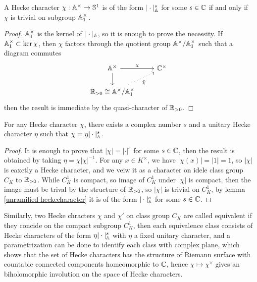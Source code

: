 \begin{lemma} \label{unramified-heckecharacter}
    A Hecke character \(\chi:\mathbb{A}^\times \to \mathbb{S}^1\) is of the form \(|\cdot|^s_{\mathbb{A}}\) for some \(s \in \mathbb{C}\) if and only if \(\chi\) is trivial on subgroup \(\mathbb{A}_1^\times\).
\end{lemma}

\begin{proof}
    \(\mathbb{A}_1^\times\) is the kernel of \(|\cdot|_{\mathbb{A}}\), so it is enough to prove the necessity. If \(\mathbb{A}_1^\times \subset \ker \chi\), then \(\chi\) factors through the quotient group \(\mathbb{A}^\times/\mathbb{A}_1^\times\) such that a diagram commutes
\[\begin{tikzcd}
	{\mathbb{A}^\times} & {\mathbb{C}}^\times \\
	{\rr_{>0} \cong \mathbb{A}^\times/\mathbb{A}_1^\times}
	\arrow["\chi", from=1-1, to=1-2]
	\arrow[from=1-1, to=2-1]
	\arrow["{\bar{\chi}}"', dotted, from=2-1, to=1-2]
\end{tikzcd}\]
     then the result is immediate by the quasi-character of \(\mathbb{R}_{>0}\).
\end{proof}

\begin{lemma}
    For any Hecke character \(\chi\), there exists a complex number \(s\) and a unitary Hecke character \(\eta\) such that \(\chi = \eta |\cdot|^s_{\mathbb{A}}\).
\end{lemma}

\begin{proof}
It is enough to prove that \(|\chi| = |\cdot|^s\) for some \(s \in \mathbb{C}\), then the result is obtained by taking \(\eta = \chi |\chi|^{-1}\). For any \(x \in K^\times\), we have \(|\chi(x)| = |1| = 1\), so \(|\chi|\) is eaxctly a Hecke character,  and we veiw it as a character on idele class group \(C_K\) to \(\mathbb{R}_{>0}\). While \(C_K^1 \) is compact, so image of \(C_K^1\) under \(|\chi|\) is compact, then the image must be trival by the structure of \(\mathbb{R}_{>0}\), so \(|\chi|\) is trivial on \(C_K^1\), by lemma \ref{unramified-heckecharacter} it is of the form \(|\cdot|^s_{\mathbb{A}}\) for some \(s \in \mathbb{C}\).
\end{proof}

    Similarly, two Hecke chracters \(\chi\) and \(\chi'\) on class group \(C_K\) are called equivalent if they concide on the compact subgroup \(C_K^1\), then each equivalence class consists of Hecke characters of the form \(\eta|\cdot|_{\mathbb{A}}^s\) with \(\eta\) a fixed unitary character, and a parametrization can be done to identify each class with complex plane, which shows that the set of Hecke characters has the structure of Riemann surface with countable connected components homeomorphic to \(\mathbb{C}\), hence \(\chi \mapsto \chi^\vee\) gives an biholomorphic involution on the space of Hecke characters.

